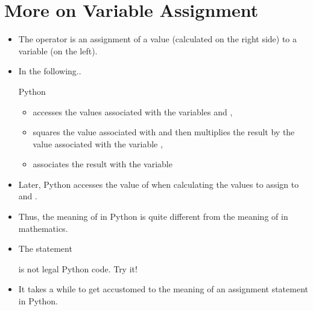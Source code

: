 \documentclass[letterpaper,10pt,english]{sphinxmanual}
\begin{document}
\section{More on Variable Assignment}
\label{\detokenize{lecture_notes/lec02_calculator:more-on-variable-assignment}}\begin{itemize}
\item {} 
The operator \sphinxcode{\sphinxupquote{=}} is an assignment of a value (calculated on the
right side) to a variable (on the left).

\item {} 
In the following..

%
\begin{sphinxVerbatim}[commandchars=\\\{\}]
       
\end{sphinxVerbatim}

Python
\begin{itemize}
\item {} 
accesses the values associated with the variables  and ,

\item {} 
squares the value associated with  and then multiplies
the result by the value associated with the variable ,

\item {} 
associates the result with the variable 

\end{itemize}

\item {} 
Later, Python accesses the value of  when calculating
the values to assign to  and .

\item {} 
Thus, the meaning of \sphinxcode{\sphinxupquote{=}} in Python is quite different from the
meaning of \sphinxcode{\sphinxupquote{=}} in mathematics.

\item {} 
The statement

%
\begin{sphinxVerbatim}[commandchars=\\\{\}]
     
\end{sphinxVerbatim}

is not legal Python code. Try it!

\item {} 
It takes a while to get accustomed to the meaning of an assignment
statement in Python.

\end{itemize}
\end{document}
